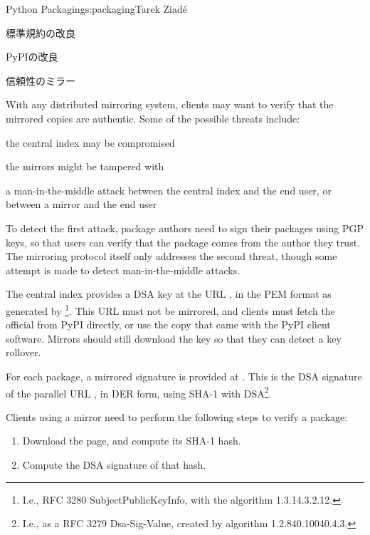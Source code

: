 \begin{aosachapter}{Python Packaging}{s:packaging}{Tarek Ziad\'{e}}
\begin{aosasect1}{標準規約の改良}
\begin{aosasect2}{PyPIの改良}
\begin{aosasect3}{信頼性のミラー}

With any distributed mirroring system, clients may want to verify that
the mirrored copies are authentic.  Some of the possible threats
include:

\begin{aosaitemize}

  \item the central index may be compromised

  \item the mirrors might be tampered with

  \item a man-in-the-middle attack between the central index and the end
  user, or between a mirror and the end user

\end{aosaitemize}

\noindent
To detect the first attack, package authors need to sign their
packages using PGP keys, so that users can verify that the package
comes from the author they trust.  The mirroring protocol itself only
addresses the second threat, though some attempt is made to detect
man-in-the-middle attacks.

The central index provides a DSA key at the URL , in
the PEM format as generated by \footnote{I.e.,
RFC 3280 SubjectPublicKeyInfo,
with the algorithm 1.3.14.3.2.12.}. This URL must not be mirrored,
and clients must fetch the official  from PyPI
directly, or use the copy that came with the PyPI client
software. Mirrors should still download the key so that they can
detect a key rollover.

For each package, a mirrored signature is provided at
.  This is the DSA signature of the parallel
URL , in DER form, using SHA-1 with
DSA\footnote{I.e., as a RFC 3279 Dsa-Sig-Value, created by algorithm
  1.2.840.10040.4.3.}.

Clients using a mirror need to perform the following steps to verify a
package:

\begin{enumerate}

  \item Download the  page, and compute its SHA-1 hash.

  \item Compute the DSA signature of that hash.


\end{enumerate}
\end{aosasect3}
\end{aosasect2}
\end{aosasect1}
\end{aosachapter}
